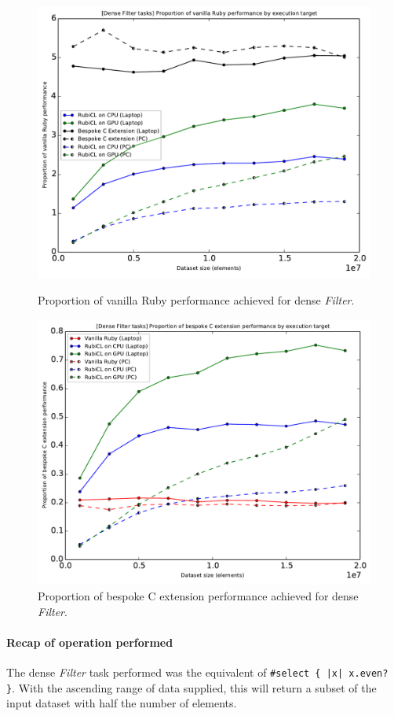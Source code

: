 \begin{figure}[H]
  \centering
  \includegraphics[width=\textwidth]{./graphing/dense_filter/prop_van.pdf}
  \caption{Proportion of vanilla Ruby performance achieved for dense \emph{Filter}.}
  \label{fig:dfilter_task_vperf_g}

  \includegraphics[width=\textwidth]{./graphing/dense_filter/prop_bes.pdf}
  \caption{Proportion of bespoke C extension performance achieved for dense \emph{Filter}.}
  \label{fig:dfilter_task_bperf_g}
\end{figure}
\paragraph*{Recap of operation performed}
The dense \emph{Filter} task performed was the equivalent of \verb!#select { |x| x.even? }!. With the ascending range of data supplied, this will return a subset of the input dataset with half the number of elements.

